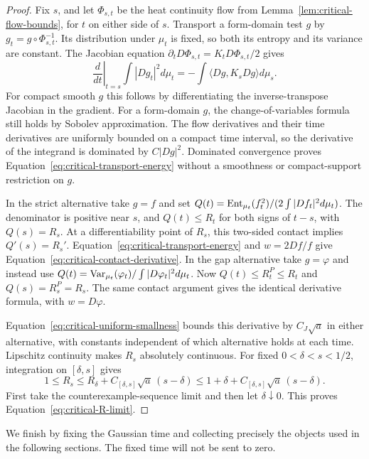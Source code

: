 \begin{proof}
Fix $s$, and let $\Phi_{s,t}$ be the heat continuity flow from
Lemma~\ref{lem:critical-flow-bounds}, for $t$ on either side
of $s$. Transport a form-domain test $g$ by
$g_t=g\circ\Phi_{s,t}^{-1}$. Its distribution under $\mu_t$
is fixed, so both its entropy and its variance are constant.
The Jacobian equation $\partial_tD\Phi_{s,t}=K_tD\Phi_{s,t}/2$
gives
\begin{equation}\label{eq:critical-transport-energy}
 \left.\frac{d}{dt}\right|_{t=s}
 \int|Dg_t|^2d\mu_t
 =-\int\langle Dg,K_sDg\rangle d\mu_s.
\end{equation}
For compact smooth $g$ this follows by differentiating the
inverse-transpose Jacobian in the gradient. For a form-domain
$g$, the change-of-variables formula still holds by Sobolev
approximation. The flow derivatives and their time derivatives
are uniformly bounded on a compact time interval, so the
derivative of the integrand is dominated by $C|Dg|^2$.
Dominated convergence proves
Equation~\eqref{eq:critical-transport-energy} without a smoothness
or compact-support restriction on $g$.

In the strict alternative take $g=f$ and set
$Q(t)=\operatorname{Ent}_{\mu_t}(f_t^2)/(2\int|Df_t|^2d\mu_t)$.
The denominator is positive near $s$, and $Q(t)\le R_t$ for
both signs of $t-s$, with $Q(s)=R_s$. At a differentiability
point of $R_s$, this two-sided contact implies $Q'(s)=R_s'$.
Equation~\eqref{eq:critical-transport-energy} and
$w=2Df/f$ give Equation~\eqref{eq:critical-contact-derivative}.
In the gap alternative take $g=\varphi$ and instead use
$Q(t)=\operatorname{Var}_{\mu_t}(\varphi_t)/\int|D\varphi_t|^2d\mu_t$.
Now $Q(t)\le R_t^P\le R_t$ and $Q(s)=R_s^P=R_s$.
The same contact argument gives the identical derivative formula,
with $w=D\varphi$.

Equation~\eqref{eq:critical-uniform-smallness} bounds this
derivative by $C_J\sqrt a$ in either alternative, with constants
independent of which alternative holds at each time. Lipschitz
continuity makes $R_s$ absolutely continuous. For fixed
$0<\delta<s<1/2$, integration on $[\delta,s]$ gives
\[
 1\le R_s\le R_\delta+C_{[\delta,s]}\sqrt a\,(s-\delta)
             \le1+\delta+C_{[\delta,s]}\sqrt a\,(s-\delta).
\]
First take the counterexample-sequence limit and then let
$\delta\downarrow0$. This proves
Equation~\eqref{eq:critical-R-limit}.
\end{proof}

We finish by fixing the Gaussian time and collecting precisely the
objects used in the following sections. The fixed time will not be
sent to zero.

